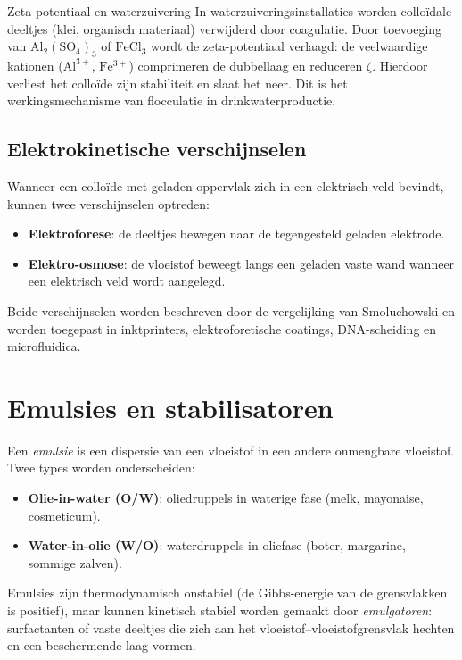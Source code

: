 \begin{voorbeeld}{Zeta-potentiaal en waterzuivering}
In waterzuiveringsinstallaties worden collo\"idale deeltjes (klei, organisch materiaal) verwijderd door coagulatie. Door toevoeging van $\mathrm{Al_2(SO_4)_3}$ of $\mathrm{FeCl_3}$ wordt de zeta-potentiaal verlaagd: de veelwaardige kationen ($\mathrm{Al^{3+}}$, $\mathrm{Fe^{3+}}$) comprimeren de dubbellaag en reduceren $\zeta$. Hierdoor verliest het collo\"ide zijn stabiliteit en slaat het neer. Dit is het werkingsmechanisme van flocculatie in drinkwaterproductie.
\end{voorbeeld}

\subsection{Elektrokinetische verschijnselen}

Wanneer een collo\"ide met geladen oppervlak zich in een elektrisch veld bevindt, kunnen twee verschijnselen optreden:
\begin{itemize}
\item \textbf{Elektroforese}: de deeltjes bewegen naar de tegengesteld geladen elektrode.
\item \textbf{Elektro-osmose}: de vloeistof beweegt langs een geladen vaste wand wanneer een elektrisch veld wordt aangelegd.
\end{itemize}
Beide verschijnselen worden beschreven door de vergelijking van Smoluchowski en worden toegepast in inktprinters, elektroforetische coatings, DNA-scheiding en microfluidica.

\section{Emulsies en stabilisatoren}
\label{sec:emulsies}

Een \emph{emulsie} is een dispersie van een vloeistof in een andere onmengbare vloeistof. Twee types worden onderscheiden:
\begin{itemize}
\item \textbf{Olie-in-water (O/W)}: oliedruppels in waterige fase (melk, mayonaise, cosmeticum).
\item \textbf{Water-in-olie (W/O)}: waterdruppels in oliefase (boter, margarine, sommige zalven).
\end{itemize}
Emulsies zijn thermodynamisch onstabiel (de Gibbs-energie van de grensvlakken is positief), maar kunnen kinetisch stabiel worden gemaakt door \emph{emulgatoren}: surfactanten of vaste deeltjes die zich aan het vloeistof--vloeistofgrensvlak hechten en een beschermende laag vormen.

